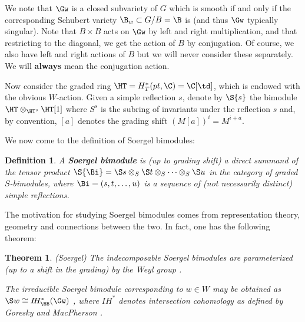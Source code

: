 \documentclass[12pt]{wart}
\newtheorem{defi}{Definition}
\newtheorem{thm}{Theorem}[section]
\theoremstyle{remark}
\begin{document}
We note that $\Gw$ is a closed subvariety of $G$ which is smooth if
and only if the corresponding Schubert variety $\B_w\subset G/B=\B$
is (and thus $\Gw$ typically singular).  Note that $B\times B$ acts on $\Gw$ by left and right
multiplication, and that restricting to the diagonal, we get the action
of $B$ by conjugation.  Of course, we also have left and right actions
of $B$ but we will never consider these separately.  We will {\bf
  always} mean the conjugation action.

Now consider the graded ring $\HT=H_T^*(pt,\C)=\C[\td] $, which is
endowed with the obvious $W$-action.  
Given a simple reflection $s$, denote by
$\S{s}$ the bimodule $\HT \otimes_{\HT^{s}} \HT[1]$ where $S^s$ is the subring of invariants under the reflection $s$ and, by convention, $[a]$ denotes the grading shift $(M[a])^i=M^{i+a}$.

We now come to the definition of Soergel bimodules:

\begin{defi} 
  A {\bf Soergel bimodule} is (up to grading shift) a direct summand
  of the tensor product $\S{\Bi} = \S s \otimes_S \S t \otimes_S \dots
  \otimes_S \S u$ in the category of graded $S$-bimodules, where $\Bi
  = (s, t, \dots, u)$ is a sequence of (not necessarily distinct)
  simple reflections.
\end{defi}

 The motivation for studying Soergel bimodules comes from
 representation theory, geometry and connections between the two. In
 fact, one has the following theorem:

 \begin{thm} {\rm (Soergel)} The indecomposable
   Soergel bimodules are parameterized (up to a shift in the grading)
   by the Weyl group \cite[Satz 6.14]{Soe05}. 

The irreducible Soergel bimodule corresponding
   to $w \in W$ may be obtained as
$\S w\cong I\!H^*_{\BB}(\Gw)$ \cite[Lemma 5]{Soe01}, where $I\!H^*$
  denotes intersection cohomology as defined by Goresky and MacPherson
  \cite{GM1}.
\end{thm}
\end{document}
